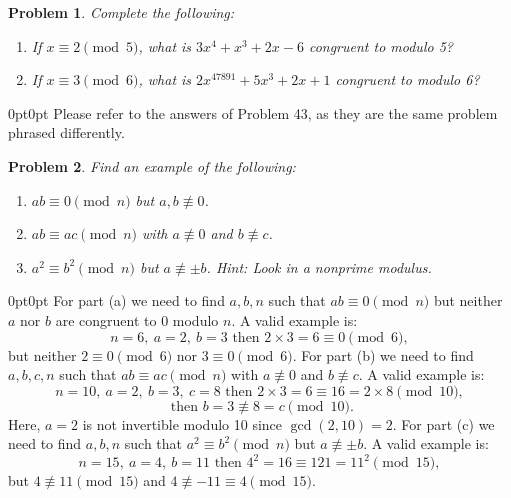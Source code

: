 \documentclass[12pt]{article}
\newtheorem{problem}{Problem}
\numberwithin{problem}{section} %
\theoremstyle{remark}  %
\newenvironment{answer}
    {\begin{adjustwidth}{0pt}{0pt}}
    {\end{adjustwidth}}
\begin{document}
\vspace{5pt}
    \setcounter{problem}{31}
    \begin{problem}
        Complete the following:
        \begin{enumerate}[label=(\alph*)]
            \item If $x \equiv 2 \pmod{5}$, what is $3x^4+x^3+2x-6$ congruent to modulo 5?
            \item If $x \equiv 3 \pmod{6}$, what is $2x^{47891}+5x^3+2x+1$ congruent to modulo 6?
        \end{enumerate}
    \end{problem}
    \begin{answer}
        Please refer to the answers of Problem 43, as they are the same problem phrased differently.
    \end{answer}
\vspace{5pt}
    \setcounter{problem}{33}
    \begin{problem}
        Find an example of the following:
        \begin{enumerate}[label=(\alph*)]
            \item $ab \equiv 0 \pmod{n}$ but $a,b \not\equiv 0$.
            \item $ab \equiv ac \pmod{n}$ with $a \not\equiv 0$  and $b \not\equiv c$.
            \item $a^2 \equiv b^2 \pmod{n}$ but $a \not\equiv\pm b$. Hint: Look in a nonprime modulus.
        \end{enumerate}
    \end{problem}
    \begin{answer}
        For part (a) we need to find \( a, b, n \) such that \( ab \equiv 0 \pmod{n} \) but neither \( a \) nor \( b \) are congruent to 0 modulo \( n \). A valid example is: $$
            n = 6, \ a = 2, \ b = 3 \text{ then } 2 \times 3 = 6 \equiv 0 \pmod{6},
        $$
        but neither \( 2 \equiv 0 \pmod{6} \) nor \( 3 \equiv 0 \pmod{6} \). For part (b) we need to find \( a, b, c, n \) such that \( ab \equiv ac \pmod{n} \) with \( a \not\equiv 0 \) and \( b \not\equiv c \). A valid example is: $$
            n = 10, \ a = 2, \ b = 3, \ c = 8 \text{ then } 2 \times 3 = 6 \equiv 16 = 2 \times 8 \pmod{10}, 
        $$ $$
            \text{ then } b = 3 \not\equiv 8 = c \pmod{10}.
        $$  
        Here, \( a = 2 \) is not invertible modulo 10 since \( \gcd(2,10) = 2 \). For part (c) we need to find \( a, b, n \) such that \( a^2 \equiv b^2 \pmod{n} \) but \( a \not\equiv \pm b \). A valid example is: $$
            n = 15, \ a = 4, \ b = 11 \text{ then } 4^2 = 16 \equiv 121 = 11^2 \pmod{15},
        $$ but \( 4 \not\equiv 11 \pmod{15} \) and \( 4 \not\equiv -11 \equiv 4 \pmod{15} \).
    \end{answer}
    
\end{document}
